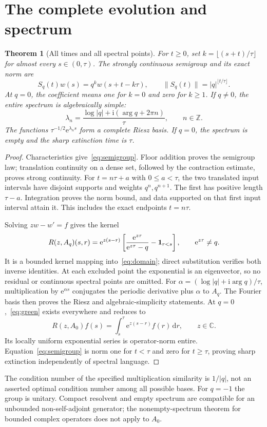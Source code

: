 \documentclass[10pt]{article}
\newcommand{\ii}{\mathrm i}
\newcommand{\e}{\mathrm e}
\newcommand{\dd}{\,\mathrm d}
\newcommand{\C}{\mathbb C}
\newcommand{\Z}{\mathbb Z}
\newtheorem{theorem}{Theorem}
\begin{document}
\section{The complete evolution and spectrum}
\begin{theorem}[All times and all spectral points]
For $t\geq0$, set $k=\lfloor(s+t)/\tau\rfloor$ for almost every
$s\in(0,\tau)$. The strongly continuous semigroup and its exact norm are
\begin{equation}
 S_q(t)w(s)=q^kw(s+t-k\tau),\qquad
 \|S_q(t)\|=|q|^{\lfloor t/\tau\rfloor}.
 \label{eq:semigroup}
\end{equation}
At $q=0$, the coefficient means one for $k=0$ and zero for $k\geq1$.
If $q\ne0$, the entire spectrum is algebraically simple:
\begin{equation}
 \lambda_n=\frac{\log|q|+\ii(\arg q+2\pi n)}{\tau},\qquad n\in\Z.
 \label{eq:spectrum}
\end{equation}
The functions $\tau^{-1/2}\e^{\lambda_ns}$ form a complete Riesz basis.
If $q=0$, the spectrum is empty and the sharp extinction time is $\tau$.
\end{theorem}
\begin{proof}
Characteristics give~\eqref{eq:semigroup}. Floor addition proves the
semigroup law; translation continuity on a dense set, followed by the
contraction estimate, proves strong continuity. For $t=n\tau+a$ with
$0\leq a<\tau$, the two translated input intervals have disjoint supports
and weights $q^n,q^{n+1}$. The first has positive length $\tau-a$.
Integration proves the norm bound, and data supported on that first input
interval attain it. This includes the exact endpoints $t=n\tau$.

Solving $zw-w'=f$ gives the kernel
\begin{equation}
 R(z,A_q)(s,r)=\e^{z(s-r)}
 \left[\frac{\e^{z\tau}}{\e^{z\tau}-q}-{\bf1}_{r<s}\right],
 \qquad \e^{z\tau}\ne q.
 \label{eq:green}
\end{equation}
It is a bounded kernel mapping into~\eqref{eq:domain}; direct substitution
verifies both inverse identities. At each excluded point the exponential
is an eigenvector, so no residual or continuous spectral points are omitted.
For $\alpha=(\log|q|+\ii\arg q)/\tau$, multiplication by $\e^{\alpha s}$
conjugates the periodic derivative plus $\alpha$ to $A_q$.
The Fourier basis then proves the Riesz and algebraic-simplicity statements.
At $q=0$,~\eqref{eq:green} exists everywhere and reduces to
\begin{equation}
 R(z,A_0)f(s)=\int_s^\tau\e^{z(s-r)}f(r)\dd r,
 \qquad z\in\C.
 \label{eq:volterra}
\end{equation}
Its locally uniform exponential series is operator-norm entire.
Equation~\eqref{eq:semigroup} is norm one for $t<\tau$ and zero for
$t\geq\tau$, proving sharp extinction independently of spectral language.
\end{proof}
The condition number of the specified multiplication similarity is
$1/|q|$, not an asserted optimal condition number among all possible bases.
For $q=-1$ the group is unitary. Compact resolvent and empty spectrum are
compatible for an unbounded non-self-adjoint generator; the nonempty-spectrum
theorem for bounded complex operators does not apply to $A_0$.
\end{document}
